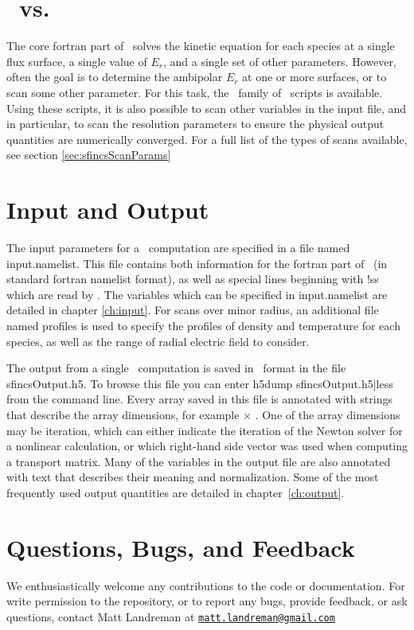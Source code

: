 \section{\sfincs~vs. \sfincsScan}
The core fortran part of \sfincs~solves the kinetic equation for each species
at a single flux surface, a single value of $E_r$, and a single set of other parameters.
However, often the goal is to determine the ambipolar $E_r$ at one or more surfaces, or to scan some other parameter.
For this task, the \sfincsScan~family of \python~scripts is available.
Using these scripts, it is also possible to scan other variables in the input file,
and in particular, to scan the resolution parameters to ensure
the physical output quantities are numerically converged.
For a full list of the types of scans available, see section \ref{sec:sfincsScanParams}

\section{Input and Output}

The input parameters for a \sfincs~computation are specified in a file named {\ttfamily input.namelist}.
This file contains both information for the fortran part of \sfincs~(in standard fortran namelist format),
as well as special lines beginning with {\ttfamily !ss} which are read by \sfincsScan.
The variables which can be specified in {\ttfamily input.namelist} are detailed in chapter \ref{ch:input}.
For scans over minor radius, an additional file named {\ttfamily profiles} is used to specify the profiles of density and temperature
for each species, as well as the range of radial electric field to consider.

The output from a single \sfincs~computation is saved in \HDF~format in the file {\ttfamily sfincsOutput.h5}.
To browse this file you can enter {\ttfamily h5dump sfincsOutput.h5|less} from the command line.
Every array saved in this file is annotated with strings that describe the array dimensions,
for example \Ntheta$\times$ \Nzeta. One of the array dimensions may be {\ttfamily iteration},
which can either indicate the iteration of the Newton solver for a nonlinear calculation,
or which right-hand side vector was used when computing a transport matrix.
Many of the variables in the output file are also annotated with
text that describes their meaning and normalization. 
Some of the most frequently used output quantities are detailed in chapter~\ref{ch:output}.

\section{Questions, Bugs, and Feedback}

We enthusiastically welcome any contributions to the code or documentation.
For write permission to the repository, or to report any bugs, provide feedback, or ask questions, contact Matt Landreman at
\href{mailto:matt.landreman@gmail.com}{\nolinkurl{matt.landreman@gmail.com} }






